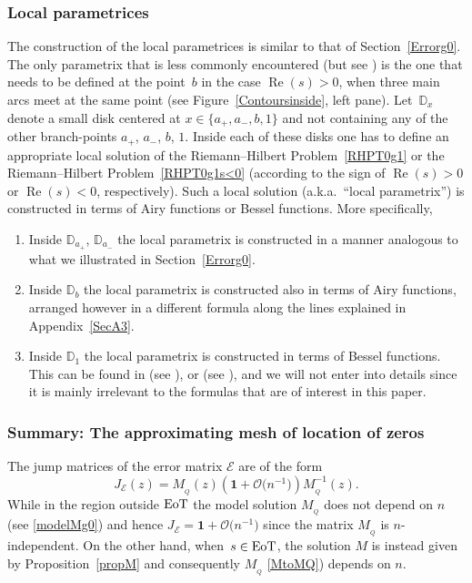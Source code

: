 \documentclass[pdftex]{sigma}
\numberwithin{equation}{section}
\theoremstyle{definition}
\def \scr{\mathscr}
\def \DD{\mathbb D}
\def\le{\left}
\def\ri{\right}
\def \1{\mathbf 1}
\def \Re{\operatorname{Re} }
\begin{document}
\subsubsection{Local parametrices}
\label{paramg1}
The construction of the local parametrices is similar to that of Section~\ref{Errorg0}. The only parametrix that is less commonly encountered (but see \cite{BertolaAdvances}) is the one that needs to be defined at the point~$b$ in the case $\Re (s)>0$, when three main arcs meet at the same point (see Figure~\ref{Contoursinside}, left pane).
Let~$\DD_x$ denote a small disk centered at $x\in\{a_+,a_-, b,1\}$ and not containing any of the other branch-points $a_+$, $a_-$, $b$, $1$. Inside each of these disks one has to define an appropriate local solution of the Riemann--Hilbert Problem~\ref{RHPT0g1} or the Riemann--Hilbert Problem~\ref{RHPT0g1s<0} (according to the sign of $\Re(s)>0$ or $\Re(s)<0$, respectively).
Such a local solution (a.k.a.\ ``local parametrix'') is constructed in terms of Airy functions or Bessel functions. More specifically,
\begin{enumerate}\itemsep=0pt
\item[(1)] Inside $\mathbb D_{a_+}$, $\mathbb D_{a_-}$ the local parametrix is constructed in a manner analogous to what we illustrated in Section~\ref{Errorg0}.
\item[(2)] Inside $\mathbb D_{b}$ the local parametrix is constructed also in terms of Airy functions, arranged however in a different formula along the lines explained in Appendix~\ref{SecA3}.
\item[(3)] Inside $\mathbb D_1$ the local parametrix is constructed in terms of Bessel functions. This can be found in (see \cite[Section~3, p.~155--156]{VanlessenStrong}), or (see \cite[Section~4.2]{BertoKatTov}), and we will not enter into details since it is mainly irrelevant to the formulas that are of interest in this paper.
\end{enumerate}

 \subsubsection{Summary: The approximating mesh of location of zeros}
 \label{summary}
 The jump matrices of the error matrix $\scr E$ are of the form
 \[
 J_{\scr E}(z) =M_{_Q}(z) \le(\1 + \mathcal O\bigl(n^{-1}\bigr)\ri) M_{_Q}^{-1}(z). \label{JE}
 \]
 While in the region outside ${\rm EoT}$ the model solution $M_{_Q}$ does not depend on $n$ (see \eqref{modelMg0}) and hence $J_{\scr E} = \1 + \mathcal O\bigl(n^{-1}\bigr)$ since the matrix $M_{_Q}$ is $n$-independent. On the other hand, when~${s\in {\rm EoT}}$, the solution $M$ is instead given by Proposition~\ref{propM} and consequently $M_{_Q}$ \eqref{MtoMQ}) depends on $n$.
\end{document}
